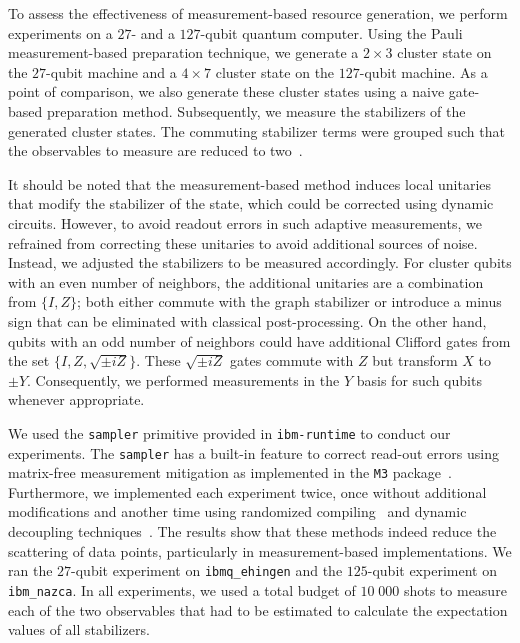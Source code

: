 \documentclass[../main.tex]{subfiles}
\begin{document}
To assess the effectiveness of measurement-based resource generation, we perform experiments on a $27$- and a $127$-qubit quantum computer. Using the Pauli measurement-based preparation technique, we generate a $2\times3$ cluster state on the $27$-qubit machine and a $4\times7$ cluster state on the $127$-qubit machine.  As a point of comparison, we also generate these cluster states using a naive gate-based preparation method. 
Subsequently, we measure the stabilizers of the generated cluster states. The commuting stabilizer terms were grouped such that the observables to measure are reduced to two~\cite{toth2005entanglement}. 


It should be noted that the measurement-based method induces local unitaries that modify the stabilizer of the state, which could be corrected using dynamic circuits. However, to avoid readout errors in such adaptive measurements, we refrained from correcting these unitaries to avoid additional sources of noise. Instead, we adjusted the stabilizers to be measured accordingly. For cluster qubits with an even number of neighbors, the additional unitaries are a combination from $\{I, Z\}$; both either commute with the graph stabilizer or introduce a minus sign that can be eliminated with classical post-processing. On the other hand, qubits with an odd number of neighbors could have additional Clifford gates from the set $\{I, Z, \sqrt{\pm iZ} \}$. These $\sqrt{\pm iZ}$ gates commute with $Z$ but transform $X$ to $\pm Y$. Consequently, we performed measurements in the $Y$ basis for such qubits whenever appropriate.

We used the \texttt{sampler} primitive provided in \texttt{ibm-runtime} to conduct our experiments.
The \texttt{sampler} has a built-in feature to correct read-out errors using matrix-free measurement mitigation as implemented in the \texttt{M3} package~\cite{PRXQuantum.2.040326}.
Furthermore, we implemented each experiment twice, once without additional modifications and another time using randomized compiling~\cite{wallman2015noise} and dynamic decoupling techniques~\cite{PhysRevA.58.2733}. The results show that these methods indeed reduce the scattering of data points, particularly in measurement-based implementations.
We ran the $27$-qubit experiment on \texttt{ibmq\_ehingen} and the $125$-qubit experiment on \texttt{ibm\_nazca}.
In all experiments, we used a total budget of $10\; 000$ shots to measure each of the two observables that had to be estimated to calculate the expectation values of all stabilizers.
\end{document}
